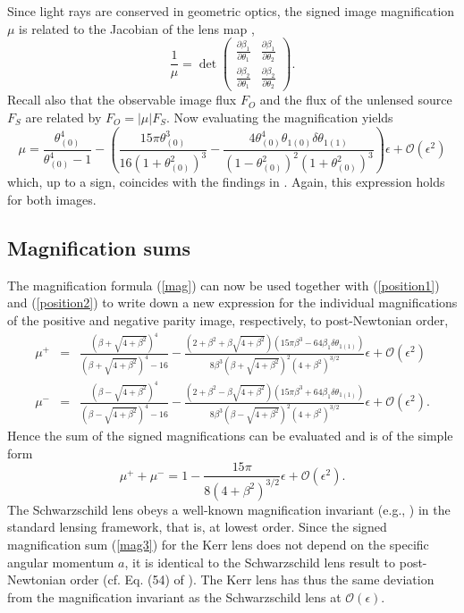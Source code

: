\documentclass[prd,12pt,a4paper,showpacs]{revtex4}
\def\dx{\delta\theta_{1(1)}}
\def\xo{\theta_1}
\def\xt{\theta_2}
\def\xn{\theta_{(0)}}
\def\xon{\theta_{1(0)}}
\def\z{\beta}
\def\zo{\z_1}
\def\zt{\z_2}
\begin{document}
Since light rays are conserved in geometric optics, 
the signed image magnification $\mu$ is related to the Jacobian of the lens map 
\cite{schneider, petters},
\[
\frac{1}{\mu}=\det\left(\begin{array}{cc}
\frac{\partial \zo}{\partial \xo}&\frac{\partial \zo}{\partial \xt}\\
\frac{\partial \zt}{\partial \xo}&\frac{\partial \zt}{\partial \xt}
\end{array}\right).
\]
Recall also that the observable image flux $F_O$ and the 
flux of the unlensed source $F_S$ are related by $F_O=|\mu|F_S$.
Now evaluating the magnification yields
\begin{equation}
\mu=\frac{\xn^4}{\xn^4-1}-\left(\frac{15\pi\xn^3}{16(1+\xn^2)^3}
-\frac{4\xn^4\xon\dx}{(1-\xn^2)^2(1+\xn^2)^3}\right)\epsilon
+\mathcal{O}(\epsilon^2)
\label{mag}
\end{equation}
which, up to a sign, coincides with the findings in \cite{sereno1}. 
Again, this expression holds for both images.

\subsection{Magnification sums}

The magnification formula (\ref{mag}) can now be used together 
with (\ref{position1}) and (\ref{position2}) to write down a new expression for 
the individual magnifications of the positive and negative parity image, respectively, 
to post-Newtonian order,
\begin{eqnarray}
\mu^+ & = & \frac{(\z+\sqrt{4+\z^2})^4}{(\z+\sqrt{4+\z^2})^4-16}
- \frac{(2+\z^2+\z\sqrt{4+\z^2})(15\pi\z^3-64\zo\dx)}{8\z^3(\z+\sqrt{4+\z^2})^2(4+\z^2)^{3/2}}
\epsilon +   \mathcal{O}(\epsilon^2) \nonumber \\
\mu^- & = & \frac{(\z-\sqrt{4+\z^2})^4}{(\z-\sqrt{4+\z^2})^4-16}
- \frac{(2+\z^2-\z\sqrt{4+\z^2})(15\pi\z^3+64\zo\dx)}{8\z^3(\z-\sqrt{4+\z^2})^2(4+\z^2)^{3/2}}
\epsilon +\mathcal{O}(\epsilon^2).
\label{mag2}
\end{eqnarray}
Hence the sum of the signed magnifications can be evaluated and is of the simple form
\begin{equation}
\mu^+ +\mu^-=1-\frac{15\pi}{8(4+\z^2)^{3/2}}\epsilon+\mathcal{O}(\epsilon^2).
\label{mag3}
\end{equation}
The Schwarzschild lens obeys a well-known magnification invariant 
(e.g., \cite[ p. 191]{petters}) in the standard lensing framework, that is,
at lowest order. Since the signed magnification sum (\ref{mag3}) for the Kerr lens 
does not depend on the specific angular momentum $a$, 
it is identical to the Schwarzschild lens result to post-Newtonian order 
(cf. Eq. (54) of \cite{keeton2}). The Kerr lens has thus the same 
deviation from the magnification invariant as the Schwarzschild lens at $\mathcal{O}(\epsilon)$.
\end{document}
